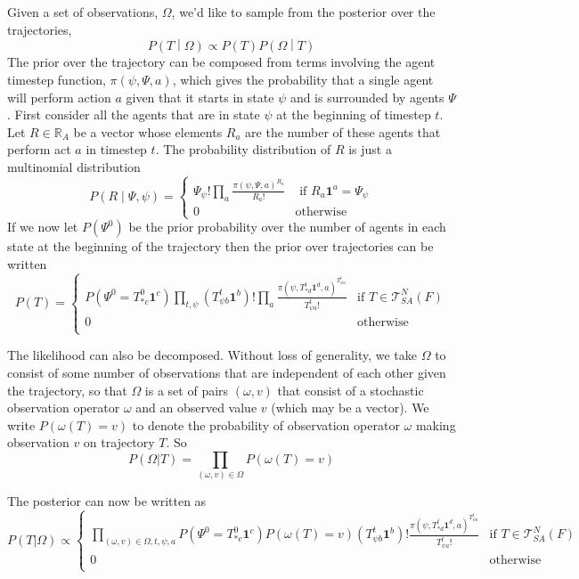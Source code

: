\documentclass{article}
\begin{document}
Given a set of observations, $\Omega$, we'd like to sample from the posterior over the trajectories,
\[
P\left(T \middle| \Omega\right) \propto P(T)P\left(\Omega \middle| T\right)
\]
The prior over the trajectory can be composed from terms involving the agent timestep function, $\pi(\psi,\Psi,a)$, which gives the probability that a single agent will perform action $a$ given that it starts in state $\psi$ and is surrounded by agents $\Psi$. First consider all the agents that are in state $\psi$ at the beginning of timestep $t$. Let $R\in\mathbb{R}_A$ be a vector whose elements $R_a$ are the number of these agents that perform act $a$ in timestep $t$. The probability distribution of $R$ is just a multinomial distribution
\begin{equation}
P\left(R \mid \Psi, \psi\right) = 
\begin{cases}
\Psi_\psi!\prod_a \frac{\pi(\psi,\Psi,a)^{R_ a}}{R_a!} & \text{ if } R_a\mathbf{1}^a = \Psi_\psi \\
0 & \text{otherwise}
\end{cases}
\end{equation}
If we now let $P(\Psi^0)$ be the prior probability over the number of agents in each state at the beginning of the trajectory then the prior over trajectories can be written 
\begin{equation}
P(T) =
\begin{cases}
P(\Psi^0 = T^0_{* c}\mathbf{1}^c)
\prod_{t, \psi}\left(T^t_{\psi b} \mathbf{1}^b \right)!
\prod_a \frac{\pi(\psi, T^{t}_{* d}\mathbf{1}^d,a)^{T^{t}_{\psi a}}}{T^{t}_{\psi a}!} & \text{if } T \in \mathcal{T}^N_{SA}(F) \\
0 & \text{otherwise}\\
\end{cases}
\end{equation}

The likelihood can also be decomposed. Without loss of generality, we take $\Omega$ to consist of some number of observations that are independent of each other given the trajectory, so that $\Omega$ is a set of pairs $(\omega,v)$ that consist of a stochastic observation operator $\omega$ and an observed value $v$ (which may be a vector). We write $P(\omega(T)=v)$ to denote the probability of observation operator $\omega$ making observation $v$ on trajectory $T$. So
\[
P(\Omega|T) = \prod_{(\omega,v) \in \Omega} P(\omega(T)=v)
\]

The posterior can now be written as
\begin{equation}
P(T|\Omega) \propto 
\begin{cases}
\prod_{(\omega,v) \in \Omega,t, \psi, a}
P(\Psi^0 = T^0_{* c}\mathbf{1}^c)
P\left(\omega(T)=v\right)
\left(T^t_{\psi b} \mathbf{1}^b \right)!
\frac{\pi(\psi, T^{t}_{* d}\mathbf{1}^d,a)^{T^{t}_{\psi a}}}{T^{t}_{\psi a}!} & 
 \text{if } T \in \mathcal{T}^N_{SA}(F) \\
0 & \text{otherwise}\\
\end{cases}
\label{posterior}
\end{equation}
\end{document}
